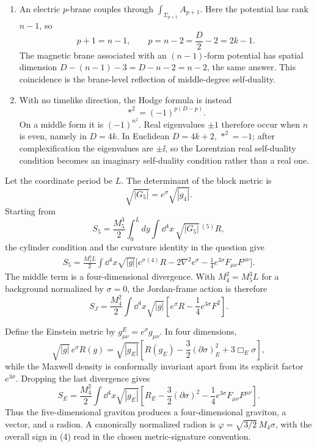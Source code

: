 \begin{enumerate}
\begin{enumerate}
    \item An electric \(p\)-brane couples through
      \(\int_{\Sigma_{p+1}}A_{p+1}\).  Here the potential has rank
      \(n-1\), so
      \[
        p+1=n-1,
        \qquad p=n-2=\frac D2-2=2k-1.
      \]
      The magnetic brane associated with an \((n-1)\)-form potential has
      spatial dimension \(D-(n-1)-3=D-n-2=n-2\), the same answer.  This
      coincidence is the brane-level reflection of middle-degree
      self-duality.

    \item With no timelike direction, the Hodge formula is instead
      \[
        *^2=(-1)^{p(D-p)}.
      \]
      On a middle form it is \((-1)^{n^2}\).  Real eigenvalues \(\pm1\)
      therefore occur when \(n\) is even, namely in \(D=4k\).  In
      Euclidean \(D=4k+2\), \(*^2=-1\); after complexification the
      eigenvalues are \(\pm \ii\), so the Lorentzian real self-duality
      condition becomes an imaginary self-duality condition rather than a
      real one.
  \end{enumerate}

  Let the coordinate period be \(L\).  The determinant of the block metric
  is
  \[
    \sqrt{|G_5|}=e^\sigma\sqrt{|g_4|}.
  \tag{1}
  \]
  Starting from
  \[
    S_5=\frac{M_5^3}{2}\int_0^Ldy\int \dd^4x\,
      \sqrt{|G_5|}\,{}^{(5)}R,
  \]
  the cylinder condition and the curvature identity in the question give
  \[
  \begin{split}
    S_5=\frac{M_5^3L}{2}\int \dd^4x\sqrt{|g|}\bigg[
       e^\sigma{}^{(4)}R-2\nabla^2e^\sigma
       -\frac14e^{3\sigma}F_{\mu\nu}F^{\mu\nu}\bigg].
  \end{split}
  \tag{2}
  \]
  The middle term is a four-dimensional divergence.  With
  \(M_4^2=M_5^3L\) for a background normalized by \(\sigma=0\), the
  Jordan-frame action is therefore
  \[
    S_J=\frac{M_4^2}{2}\int \dd^4x\sqrt{|g|}
      \left[e^\sigma R-\frac{1}{4}e^{3\sigma}F^2\right].
  \tag{3}
  \]

  Define the Einstein metric by
  \(g^E_{\mu\nu}=e^\sigma g_{\mu\nu}\).  In four dimensions,
  \[
    \sqrt{|g|}\,e^\sigma R(g)
      =\sqrt{|g_E|}\left[R(g_E)
        -\frac32(\partial\sigma)^2_E+3\Box_E\sigma\right],
  \]
  while the Maxwell density is conformally invariant apart from its
  explicit factor \(e^{3\sigma}\).  Dropping the last divergence gives
  \[
    \boxed{
    S_E=\frac{M_4^2}{2}\int \dd^4x\sqrt{|g_E|}
      \left[R_E-\frac32(\partial\sigma)^2
            -\frac14e^{3\sigma}F_{\mu\nu}F^{\mu\nu}\right].}
  \tag{4}
  \]
  Thus the five-dimensional graviton produces a four-dimensional graviton,
  a vector, and a radion.  A canonically normalized radion is
  \(\varphi=\sqrt{3/2}\,M_4\sigma\), with the overall sign in (4) read in
  the chosen metric-signature convention.


\end{enumerate}
